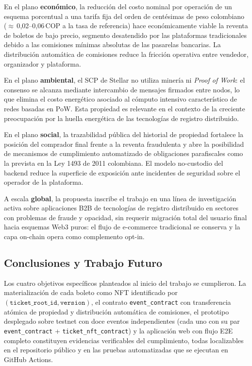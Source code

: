 En el plano \textbf{económico}, la reducción del costo nominal por operación de un esquema porcentual a una
tarifa fija del orden de centésimas de peso colombiano ($\approx$\,0{,}02--0{,}06\,COP a la tasa de
referencia) hace económicamente viable la reventa de boletos de bajo precio, segmento desatendido por las
plataformas tradicionales debido a las comisiones mínimas absolutas de las pasarelas bancarias. La
distribución automática de comisiones reduce la fricción operativa entre vendedor, organizador y plataforma.

En el plano \textbf{ambiental}, el SCP de Stellar no utiliza minería ni \textit{Proof of Work}: el consenso
se alcanza mediante intercambio de mensajes firmados entre nodos, lo que elimina el costo energético asociado
al cómputo intensivo característico de redes basadas en PoW. Esta propiedad es relevante en el contexto de la
creciente preocupación por la huella energética de las tecnologías de registro distribuido.

En el plano \textbf{social}, la trazabilidad pública del historial de propiedad fortalece la posición del
comprador final frente a la reventa fraudulenta y abre la posibilidad de mecanismos de cumplimiento
automatizado de obligaciones parafiscales como la prevista en la Ley 1493 de 2011 colombiana. El modelo
no-custodio del backend reduce la superficie de exposición ante incidentes de seguridad sobre el operador de
la plataforma.

A escala \textbf{global}, la propuesta inscribe el trabajo en una línea de investigación activa sobre
aplicaciones B2B de tecnologías de registro distribuido en sectores con problemas de fraude y opacidad, sin
requerir migración total del usuario final hacia esquemas Web3 puros: el flujo de e-commerce tradicional se
conserva y la capa on-chain opera como complemento opt-in.

\subsection{Conclusiones y Trabajo Futuro}

Los cuatro objetivos específicos planteados al inicio del trabajo se cumplieron. La materialización de cada
boleto como NFT identificado por \((\texttt{ticket\_root\_id}, \texttt{version})\), el contrato
\texttt{event\_contract} con transferencia atómica de propiedad y distribución automática de comisiones, el
prototipo desplegado sobre testnet con doce eventos independientes (cada uno con su par
\texttt{event\_contract} + \texttt{ticket\_nft\_contract}) y la aplicación web con flujo E2E completo
constituyen evidencias verificables del cumplimiento, todas localizables en el repositorio público y en las
pruebas automatizadas que se ejecutan en GitHub Actions.

